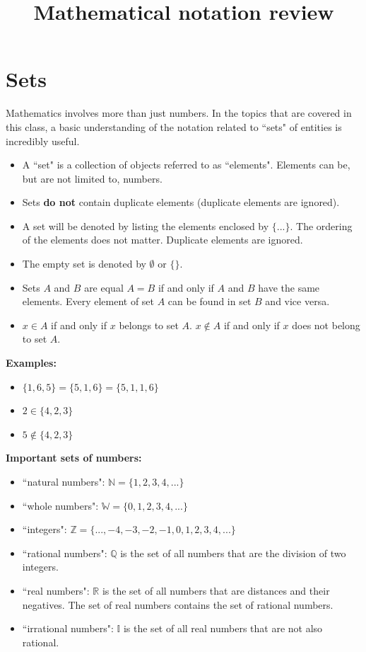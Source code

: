 \documentclass{article}
\title{Mathematical notation review}
\date{}
\begin{document}
\maketitle

\section*{Sets}

Mathematics involves more than just numbers. In the topics that are covered in this class, a basic understanding of the notation related to ``sets" of entities is incredibly useful.  

\begin{itemize}
\item A ``set" is a collection of objects referred to as ``elements". Elements can be, but are not limited to, numbers.
\item Sets {\bf do not} contain duplicate elements (duplicate elements are ignored).
\item A set will be denoted by listing the elements enclosed by \(\{...\}\). The ordering of the elements does not matter. Duplicate elements are ignored.
\item The empty set is denoted by \(\emptyset\) or \(\{\}\).
\item Sets \(A\) and \(B\) are equal \(A = B\) if and only if \(A\) and \(B\) have the same elements. Every element of set \(A\) can be found in set \(B\) and vice versa.
\item \(x \in A\) if and only if \(x\) belongs to set \(A\). \(x \notin A\) if and only if \(x\) does not belong to set \(A\).
\end{itemize}

\textbf{Examples:}
\begin{itemize}
\item \(\{1, 6, 5\} = \{5, 1, 6\} = \{5, 1, 1, 6\}\)
\item \(2 \in \{4, 2, 3\}\)
\item \(5 \notin \{4, 2, 3\}\)
\end{itemize}

\textbf{Important sets of numbers:}
\begin{itemize}
\item ``natural numbers": \(\mathbb{N} = \{1, 2, 3, 4, ...\}\)
\item ``whole numbers": \(\mathbb{W} = \{0, 1, 2, 3, 4, ...\}\)
\item ``integers": \(\mathbb{Z} = \{..., -4, -3, -2, -1, 0, 1, 2, 3, 4, ...\}\)
\item ``rational numbers": \(\mathbb{Q}\) is the set of all numbers that are the division of two integers. 
\item ``real numbers": \(\mathbb{R}\) is the set of all numbers that are distances and their negatives. The set of real numbers contains the set of rational numbers.
\item ``irrational numbers": \(\mathbb{I}\) is the set of all real numbers that are not also rational. %
\end{itemize}
\end{document}
